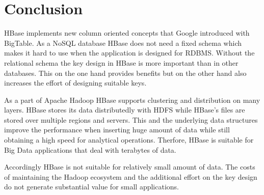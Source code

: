 
\section{Conclusion}
HBase implements new column oriented concepts that Google introduced with BigTable. As a NoSQL database HBase does not need a fixed schema which makes it hard to use when the application is designed for RDBMS. Without the relational schema the key design in HBase is more important than in other databases. This on the one hand provides benefits but on the other hand also increases the effort of designing suitable keys. 

As a part of Apache Hadoop HBase supports clustering and distribution on many layers. HBase stores its data distributedly with HDFS while HBase's files are stored over multiple regions and servers. This and the underlying data structures improve the performance when inserting huge amount of data while still obtaining a high speed for analytical operations. Therfore, HBase is suitable for Big Data applications that deal with terabytes of data. 

Accordingly HBase is not suitable for relatively small amount of data. The costs of maintaining the Hadoop ecosystem and the additional effort on the key design do not generate substantial value for small applications.

